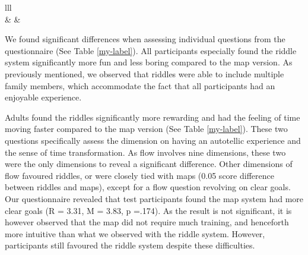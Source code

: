 \begin{table}[h]
\begin{tabular}{lll}
                                                                                                                                                                                                                                         \\ \hline
{}                                                                   &                   &                     \\ \hline
{}                                                                                                                                      
\end{tabular}
\end{table}

We found significant differences when assessing individual questions from the questionnaire (See Table \ref{my-label}). All participants especially found the riddle system significantly more fun and less boring compared to the map version. As previously mentioned, we observed that riddles were able to include multiple family members, which  accommodate the fact that all participants had an enjoyable experience. 

Adults found the riddles significantly more rewarding and had the feeling of time moving faster compared to the map version (See Table \ref{my-label}). These two questions specifically assess the dimension on having an autotellic experience and the sense of time transformation. As flow involves nine dimensions, these two were the only dimensions to reveal a significant difference. Other dimensions of flow favoured riddles, or were closely tied with maps (0.05 score difference between riddles and maps), except for a flow question revolving on clear goals. Our questionnaire revealed that test participants found the map system had more clear goals (R = 3.31, M = 3.83, p =.174). As the result is not significant, it is however observed that the map did not require much training, and henceforth more intuitive than what we observed with the riddle system. However, participants still favoured the riddle system despite these difficulties. 


